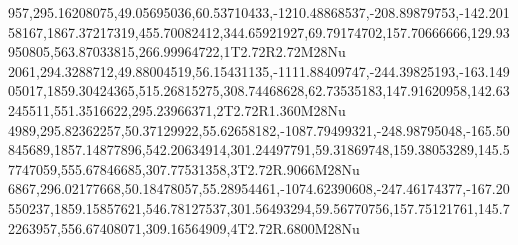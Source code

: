 957,295.16208075,49.05695036,60.53710433,-1210.48868537,-208.89879753,-142.20158167,1867.37217319,455.70082412,344.65921927,69.79174702,157.70666666,129.93950805,563.87033815,266.99964722,1T2.72R2.72M28Nu
2061,294.3288712,49.88004519,56.15431135,-1111.88409747,-244.39825193,-163.14905017,1859.30424365,515.26815275,308.74468628,62.73535183,147.91620958,142.63245511,551.3516622,295.23966371,2T2.72R1.360M28Nu
4989,295.82362257,50.37129922,55.62658182,-1087.79499321,-248.98795048,-165.50845689,1857.14877896,542.20634914,301.24497791,59.31869748,159.38053289,145.57747059,555.67846685,307.77531358,3T2.72R.9066M28Nu
6867,296.02177668,50.18478057,55.28954461,-1074.62390608,-247.46174377,-167.20550237,1859.15857621,546.78127537,301.56493294,59.56770756,157.75121761,145.72263957,556.67408071,309.16564909,4T2.72R.6800M28Nu
